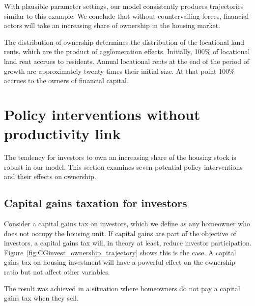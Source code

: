 With plausible parameter settings, our model consistently produces trajectories similar to this example. We conclude that 
without countervailing forces, financial actors will take an increasing share of ownership in the housing market. 

The distribution of ownership determines the distribution of the locational land rents, which are the product of agglomeration effects. 
Initially, 100\% of locational land rent accrues to residents.   Annual locational rents at the end of the period of growth are approximately twenty times their initial size. At that point 100\% accrues to the owners of financial capital. %



\section{Policy interventions without productivity link}

The tendency for investors to own an increasing share of the housing stock is robust in our model. This section examines seven potential policy interventions and their effects on ownership. 

\newpage
\subsection{Capital gains taxation for investors}

Consider a capital gains tax on investors, which we define as any homeowner who does not occupy the housing unit. If capital gains are part of the objective of investors, a capital gains tax will, in theory at least, reduce investor participation. Figure~\ref{fig:CGinvest_ownership_trajectory} shows this is the case. A capital gains tax on housing investment will have a powerful effect on the ownership ratio but not affect other variables.

The result was achieved in a situation where homeowners do not pay a capital gains tax when they sell. 

